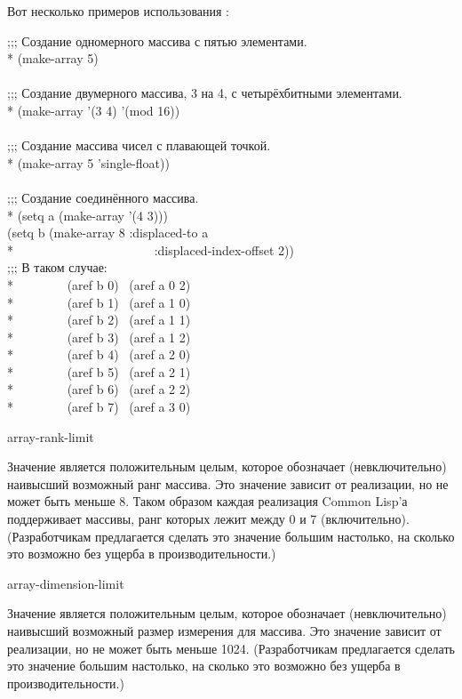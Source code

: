 \begin{defun}[Функция]
Вот несколько примеров использования :
\begin{lisp}
;;; Создание одномерного массива с пятью элементами. \\*
(make-array 5) \\
 \\
;;; Создание двумерного массива, 3 на 4, с четырёхбитными элементами. \\*
(make-array '(3 4)  '(mod 16)) \\
 \\
;;; Создание массива чисел с плавающей точкой.\\*
(make-array 5  'single-float)) \\
\\
;;; Создание соединённого массива. \\*
(setq a (make-array '(4 3))) \\
(setq b (make-array 8 :displaced-to a \\*
~~~~~~~~~~~~~~~~~~~~~~:displaced-index-offset 2)) \\
;;; В таком случае: \\*
~~~~~~~~(aref b 0) \EQ\ (aref a 0 2) \\*
~~~~~~~~(aref b 1) \EQ\ (aref a 1 0) \\*
~~~~~~~~(aref b 2) \EQ\ (aref a 1 1) \\*
~~~~~~~~(aref b 3) \EQ\ (aref a 1 2) \\*
~~~~~~~~(aref b 4) \EQ\ (aref a 2 0) \\*
~~~~~~~~(aref b 5) \EQ\ (aref a 2 1) \\*
~~~~~~~~(aref b 6) \EQ\ (aref a 2 2) \\*
~~~~~~~~(aref b 7) \EQ\ (aref a 3 0)
\end{lisp}
\end{defun}

\begin{defun}[Константа]
array-rank-limit

Значение  является положительным целым, которое обозначает
(невключительно) наивысший возможный ранг массива.
Это значение зависит от реализации, но не может быть меньше 8. Таком образом
каждая реализация Common Lisp'а поддерживает массивы, ранг которых лежит между 0
и 7 (включительно).
(Разработчикам предлагается сделать это значение большим настолько, на сколько
это возможно без ущерба в производительности.)
\end{defun}

\begin{defun}[Константа]
array-dimension-limit

Значение  является положительным целым, которое
обозначает (невключительно) наивысший возможный размер измерения для массива.
Это значение зависит от реализации, но не может быть меньше 1024.
(Разработчикам предлагается сделать это значение большим настолько, на сколько
это возможно без ущерба в производительности.)
\end{defun}

